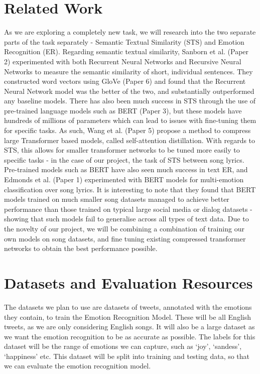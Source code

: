 \documentclass[11pt]{article}
\begin{document}
\section{Related Work}
As we are exploring a completely new task, we will research into the two separate parts of the task separately - Semantic Textual Similarity (STS) and Emotion Recognition (ER). Regarding semantic textual similarity, Sanborn et al. (Paper 2) experimented with both Recurrent Neural Networks and Recursive Neural Networks to measure the semantic similarity of short, individual sentences. They constructed word vectors using GloVe (Paper 6) and found that the Recurrent Neural Network model was the better of the two, and substantially outperformed any baseline models. There has also been much success in STS through the use of pre-trained language models such as BERT (Paper 3), but these models have hundreds of millions of parameters which can lead to issues with fine-tuning them for specific tasks. As such, Wang et al. (Paper 5) propose a method to compress large Transformer based models, called self-attention distillation. With regards to STS, this allows for smaller transformer networks to be tuned more easily to specific tasks - in the case of our project, the task of STS between song lyrics. Pre-trained models such as BERT have also seen much success in text ER, and Edmonds et al. (Paper 1) experimented with BERT models for multi-emotion classification over song lyrics. It is interesting to note that they found that BERT models trained on much smaller song datasets managed to achieve better performance than those trained on typical large social media or dialog datasets - showing that such models fail to generalise across all types of text data. Due to the novelty of our project, we will be combining a combination of training our own models on song datasets, and fine tuning existing compressed transformer networks to obtain the best performance possible.
\section{Datasets and Evaluation Resources}
The datasets we plan to use are datasets of tweets\cite{gupta_2021}\cite{pandey_2022}, annotated with the emotions they contain, to train the Emotion Recognition Model. These will be all English tweets, as we are only considering English songs. It will also be a large dataset as we want the emotion recognition to be as accurate as possible. The labels for this dataset will be the range of emotions we can capture, such as `joy', `sandess', `happiness' etc. This dataset will be split into training and testing data, so that we can evaluate the emotion recognition model.
\end{document}
